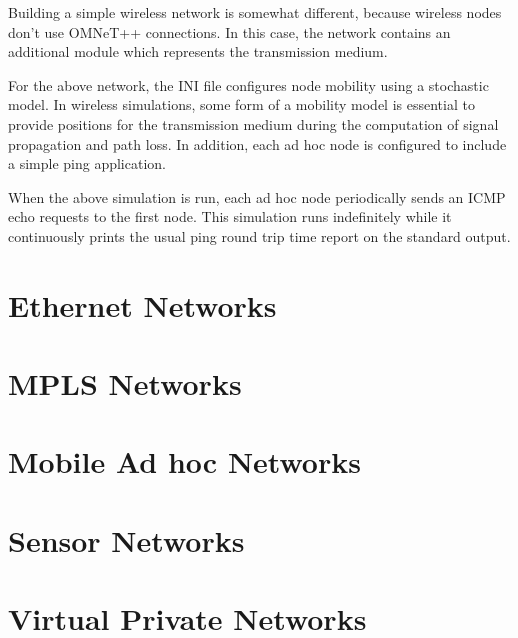 Building a simple wireless network is somewhat different, because wireless
nodes don't use OMNeT++ connections. In this case, the network contains an
additional module which represents the transmission medium.


For the above network, the INI file configures node mobility using a
stochastic model. In wireless simulations, some form of a mobility model is
essential to provide positions for the transmission medium during the
computation of signal propagation and path loss. In addition, each ad hoc
node is configured to include a simple ping application.


When the above simulation is run, each ad hoc node periodically sends an
ICMP echo requests to the first node. This simulation runs indefinitely
while it continuously prints the usual ping round trip time report on the
standard output.

\section{Ethernet Networks}


\section{MPLS Networks}


\section{Mobile Ad hoc Networks}


\section{Sensor Networks}


\section{Virtual Private Networks}

